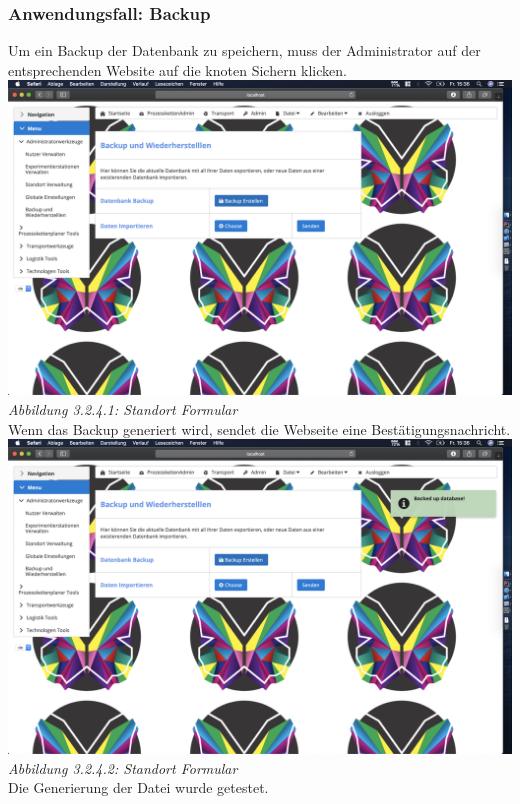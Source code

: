 \documentclass[enabledeprecatedfontcommands,fontsize=12pt,paper=a4,twoside]{scrartcl}
\begin{document}
\subsubsection{Anwendungsfall: Backup}


Um ein Backup der Datenbank zu speichern, muss der Administrator auf der entsprechenden Website auf die knoten Sichern klicken.\\
\hypertarget{sc3.1.5.1}{
\includegraphics[width=1\textwidth]{Screenshots/5BackFormular.png}
\textit{Abbildung 3.2.4.1: Standort Formular}
} \\

Wenn das Backup generiert wird, sendet die Webseite eine Bestätigungsnachricht.\\
\hypertarget{sc3.1.5.2}{
\includegraphics[width=1\textwidth]{Screenshots/5BackGenerated.png}
\textit{Abbildung 3.2.4.2: Standort Formular}
} \\

Die Generierung der Datei wurde getestet.\\
\end{document}
